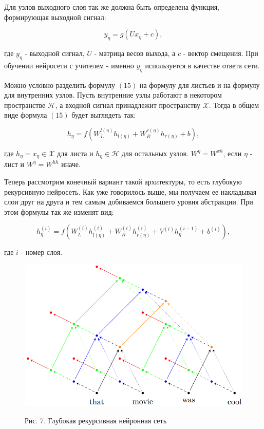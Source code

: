 \documentclass[14pt]{article}
\begin{document}
Для узлов выходного слоя так же должна быть определена функция, формирующая выходной сигнал:

\begin{equation}
y_\eta=g(Ux_\eta + c),
\end{equation}

где $y_\eta$ - выходной сигнал, $U$ - матрица весов выхода, а $c$ - вектор смещения. При обучении нейросети с учителем - именно $y_\eta$ используется в качестве ответа сети.


Можно условно разделить формулу $(15)$ на формулу для листьев и на формулу для внутренних узлов. Пусть внутренние узлы работают в некотором пространстве $\mathcal{H}$, а входной сигнал принадлежит пространству $\mathcal{X}$. Тогда в общем виде формула $(15)$ будет выглядеть так:


\begin{equation}
h_\eta=f(W_L^{l(\eta)}h_{l(\eta)} + W_R^{r(\eta)}h_{r(\eta)} + b),
\end{equation}


где $h_\eta = x_\eta \in \mathcal{X}$ для листа и $h_\eta \in \mathcal{H}$ для остальных узлов. $W^\eta = W^{xh}$, если $\eta$ - лист и $W^\eta=W^{hh}$ иначе.


Теперь рассмотрим конечный вариант такой архитектуры, то есть глубокую рекурсивную нейросеть. Как уже говорилось выше, мы получаем ее накладывая слои друг на друга и тем самым добиваемся большего уровня абстракции. При этом формулы так же изменят вид:

\begin{equation}
h_\eta^{(i)}=f(W_L^{(i)}h_{l(\eta)}^{(i)} + W_R^{(i)}h_{r(\eta)}^{(i)} + V^{(i)}h_\eta^{(i - 1)} + b^{(i)}),
\end{equation}

где $i$ - номер слоя.

\begin{figure}[!h]
    \centering
        \includegraphics[width=16cm]{Fig7.png}
    \parbox[t][1.2cm][c]{16cm}{
        \centering
        Рис. 7. Глубокая рекурсивная нейронная сеть
    }
\end{figure}
\end{document}
